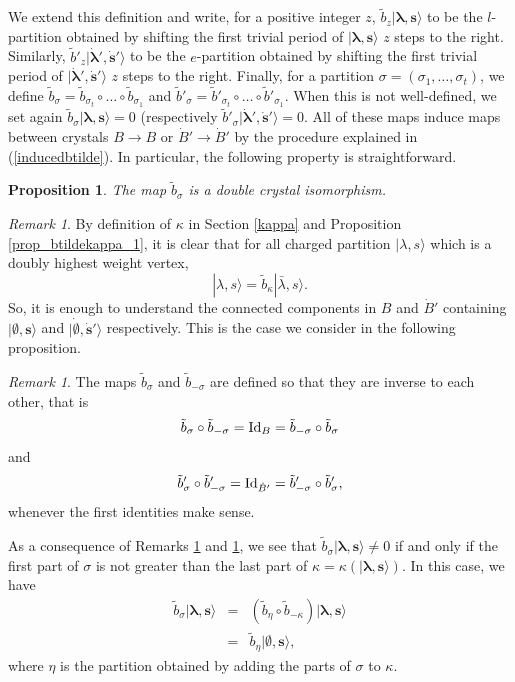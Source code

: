 \documentclass[twoside,12pt]{amsart}
\theoremstyle{plain}
\newcommand{\bs}{\mathbf{s}}
\newcommand{\si}{\sigma}
\newcommand{\la}{\lambda}
\newcommand{\ka}{\kappa}
\newcommand{\bla}{\boldsymbol{\la}}
\newcommand{\tb}{\tilde{b}}
\newcommand{\dB}{\dot{B}}
\newcommand{\dbs}{\dot{\bs}}
\newcommand{\dbla}{\dot{\bla}}
\newcommand{\lra}{\longrightarrow}
\newcommand{\id}{\text{\rm Id}}
\newcommand{\bemp}{\boldsymbol{\emptyset}}
\newcommand{\dbemp}{\dot{\bemp}}
\newtheorem{prop}[num]{Proposition}
\theoremstyle{remark}
\newtheorem{rem}[num]{Remark}
\begin{document}
We extend this definition and write, for a positive integer $z$,
$\tb_z|\bla,\bs\rangle$ to be the $l$-partition obtained 
by shifting the first trivial period of $|\bla,\bs\rangle$ $z$ steps to the right.
Similarly, 
$\tb'_z|\dbla',\dbs'\rangle$ to be the $e$-partition obtained 
by shifting the first trivial period of $|\dbla',\dbs'\rangle$ $z$ steps to the right.
Finally, for a partition $\si=(\si_1,\dots,\si_t)$, we define 
$\tb_{\si} =  \tb_{\si_t} \circ \dots \circ \tb_{\si_1}$ and 
$\tb'_{\si} =  \tb'_{\si_t} \circ \dots \circ \tb'_{\si_1}$.
When this is not well-defined, we set again $\tb_{\si}|\bla,\bs\rangle =0$ 
(respectively $\tb'_{\si}|\dbla',\dbs'\rangle=0$.
All of these maps induce maps between crystals $B\lra B$
or $\dB'\lra \dB'$ by the procedure explained in (\ref{inducedbtilde}).
In particular, the following property is straightforward.

\begin{prop}\label{prop_btildekappa+}
The map $\tb_{\si}$ is a double crystal isomorphism.
\end{prop}


\begin{rem}\label{rem_btilde_inv}
By definition of $\ka$ in Section \ref{kappa} and Proposition \ref{prop_btildekappa_1},
it is clear that for all charged partition $|\la,s\rangle$
which is a doubly highest weight vertex,
$$|\la,s\rangle = \tb_{\ka} |\bar{\la},s\rangle.$$
So, it is enough to understand the connected components in $B$ and $\dB'$
containing $|\bemp,\bs\rangle$ and $|\dbemp,\dbs'\rangle$ respectively.
This is the case we consider in the following proposition.
\end{rem}

\begin{rem}\label{rem_btilde_inv_1}
The maps $\tb_{\si}$ and $\tb_{-\si}$ are defined so that they are 
inverse to each other, that is 
$$ \tb_{\si} \circ \tb_{-\si} = \id_{B} = \tb_{-\si} \circ \tb_{\si}$$
and  
$$ \tb'_{\si} \circ \tb'_{-\si} = \id_{\dB'} = \tb'_{-\si} \circ \tb'_{\si},$$
whenever the first identities make sense.
\end{rem}

As a consequence of Remarks \ref{rem_btilde_inv} and \ref{rem_btilde_inv_1},
we see that $\tb_{\si}|\bla,\bs\rangle \neq 0$ if and only if 
the first part of $\si$ is not greater than the last part of $\ka=\ka(|\bla,\bs\rangle)$.
In this case, we have 
\begin{equation}\label{heis_map}
\begin{array}{ccl} 
\tb_{\si}|\bla,\bs\rangle & = & (\tb_{\eta}\circ\tb_{-\ka})|\bla,\bs\rangle \\
& = & \tb_{\eta}|\bemp,\bs\rangle, 
\end{array}
\end{equation}
where $\eta$ is the partition obtained by adding the parts of $\si$ to $\ka$.
\end{document}
